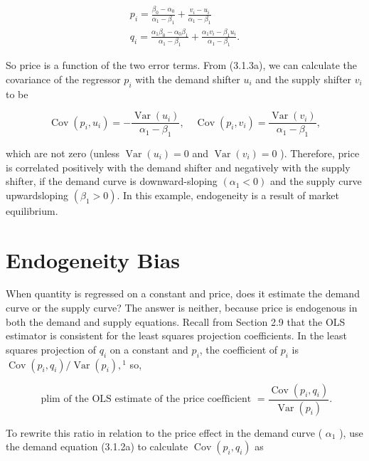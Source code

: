 \documentclass[10pt]{article}
\begin{document}
\begin{gather*}
p_{i}=\frac{\beta_{0}-\alpha_{0}}{\alpha_{1}-\beta_{1}}+\frac{v_{i}-u_{i}}{\alpha_{1}-\beta_{1}}  \tag{3.1.3a}\\
q_{i}=\frac{\alpha_{1} \beta_{0}-\alpha_{0} \beta_{1}}{\alpha_{1}-\beta_{1}}+\frac{\alpha_{1} v_{i}-\beta_{1} u_{i}}{\alpha_{1}-\beta_{1}} . \tag{3.1.3b}
\end{gather*}


So price is a function of the two error terms. From (3.1.3a), we can calculate the covariance of the regressor $p_{i}$ with the demand shifter $u_{i}$ and the supply shifter $v_{i}$ to be


\begin{equation*}
\operatorname{Cov}\left(p_{i}, u_{i}\right)=-\frac{\operatorname{Var}\left(u_{i}\right)}{\alpha_{1}-\beta_{1}}, \quad \operatorname{Cov}\left(p_{i}, v_{i}\right)=\frac{\operatorname{Var}\left(v_{i}\right)}{\alpha_{1}-\beta_{1}}, \tag{3.1.4}
\end{equation*}


which are not zero (unless $\operatorname{Var}\left(u_{i}\right)=0$ and $\operatorname{Var}\left(v_{i}\right)=0$ ). Therefore, price is correlated positively with the demand shifter and negatively with the supply shifter, if the demand curve is downward-sloping $\left(\alpha_{1}<0\right)$ and the supply curve upwardsloping $\left(\beta_{1}>0\right)$. In this example, endogeneity is a result of market equilibrium.

\section*{Endogeneity Bias}
When quantity is regressed on a constant and price, does it estimate the demand curve or the supply curve? The answer is neither, because price is endogenous in both the demand and supply equations. Recall from Section 2.9 that the OLS estimator is consistent for the least squares projection coefficients. In the least squares projection of $q_{i}$ on a constant and $p_{i}$, the coefficient of $p_{i}$ is $\operatorname{Cov}\left(p_{i}, q_{i}\right) / \operatorname{Var}\left(p_{i}\right),{ }^{1}$ so,


\begin{equation*}
\text { plim of the OLS estimate of the price coefficient }=\frac{\operatorname{Cov}\left(p_{i}, q_{i}\right)}{\operatorname{Var}\left(p_{i}\right)} . \tag{3.1.5}
\end{equation*}


To rewrite this ratio in relation to the price effect in the demand curve ( $\alpha_{1}$ ), use the demand equation (3.1.2a) to calculate $\operatorname{Cov}\left(p_{i}, q_{i}\right)$ as
\end{document}
